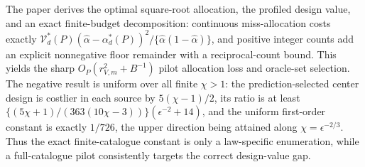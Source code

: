 The paper derives the optimal square-root allocation, the profiled design value, and an exact finite-budget decomposition: continuous miss-allocation costs exactly \(\mathcal V_d^*(P)(\widehat\alpha-\alpha_d^*(P))^2/\{\widehat\alpha(1-\widehat\alpha)\}\), and positive integer counts add an explicit nonnegative floor remainder with a reciprocal-count bound. This yields the sharp \(O_P(r_{V,m}^2+B^{-1})\) pilot allocation loss and oracle-set selection. The negative result is uniform over all finite \(\chi>1\): the prediction-selected center design is costlier in each source by \(5(\chi-1)/2\), its ratio is at least \(\{(5\chi+1)/(363(10\chi-3))\}(\epsilon^{-2}+14)\), and the uniform first-order constant is exactly \(1/726\), the upper direction being attained along \(\chi=\epsilon^{-2/3}\). Thus the exact finite-catalogue constant is only a law-specific enumeration, while a full-catalogue pilot consistently targets the correct design-value gap.